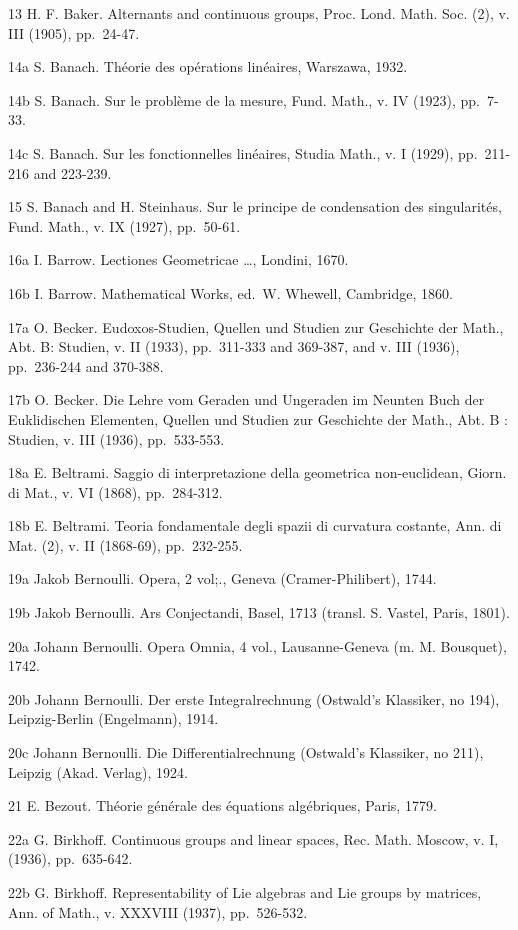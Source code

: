 13 H. F. Baker. Alternants and continuous groups, Proc. Lond. Math. Soc. (2), v. III (1905), pp.~24-47.

14a S. Banach. Théorie des opérations linéaires, Warszawa, 1932.

14b S. Banach. Sur le problème de la mesure, Fund. Math., v. IV (1923), pp.~7-33.

14c S. Banach. Sur les fonctionnelles linéaires, Studia Math., v. I (1929), pp.~211-216 and 223-239.

15 S. Banach and H. Steinhaus. Sur le principe de condensation des singularités, Fund. Math., v. IX (1927), pp.~50-61.

16a I. Barrow. Lectiones Geometricae \ldots, Londini, 1670.

16b I. Barrow. Mathematical Works, ed.~W. Whewell, Cambridge, 1860.

17a O. Becker. Eudoxos-Studien, Quellen und Studien zur Geschichte der Math., Abt. B: Studien, v. II (1933), pp.~311-333 and 369-387, and v. III (1936), pp.~236-244 and 370-388.

17b O. Becker. Die Lehre vom Geraden und Ungeraden im Neunten Buch der Euklidischen Elementen, Quellen und Studien zur Geschichte der Math., Abt. B : Studien, v. III (1936), pp.~533-553.

18a E. Beltrami. Saggio di interpretazione della geometrica non-euclidean, Giorn. di Mat., v. VI (1868), pp.~284-312.

18b E. Beltrami. Teoria fondamentale degli spazii di curvatura costante, Ann. di Mat. (2), v. II (1868-69), pp.~232-255.

19a Jakob Bernoulli. Opera, 2 vol;., Geneva (Cramer-Philibert), 1744.

19b Jakob Bernoulli. Ars Conjectandi, Basel, 1713 (transl. S. Vastel, Paris, 1801).

20a Johann Bernoulli. Opera Omnia, 4 vol., Lausanne-Geneva (m. M. Bousquet), 1742.

20b Johann Bernoulli. Der erste Integralrechnung (Ostwald's Klassiker, no 194), Leipzig-Berlin (Engelmann), 1914.

20c Johann Bernoulli. Die Differentialrechnung (Ostwald's Klassiker, no 211), Leipzig (Akad. Verlag), 1924.

21 E. Bezout. Théorie générale des équations algébriques, Paris, 1779.

22a G. Birkhoff. Continuous groups and linear spaces, Rec. Math. Moscow, v. I, (1936), pp.~635-642.

22b G. Birkhoff. Representability of Lie algebras and Lie groups by matrices, Ann. of Math., v. XXXVIII (1937), pp.~526-532.

